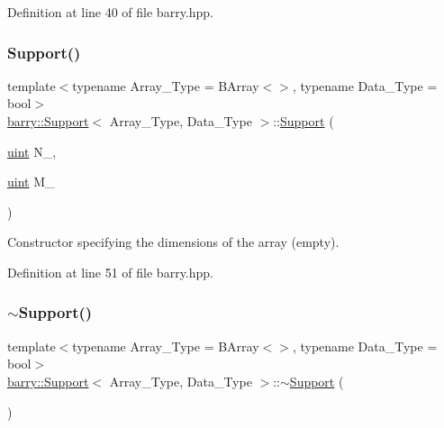 Definition at line 40 of file barry.\+hpp.

\mbox{\label{classbarry_1_1_support_aa451bd21c09935b686869fef96c5b874}} 
\subsubsection{\texorpdfstring{Support()}{Support()}\hspace{0.1cm}{\footnotesize\ttfamily [2/2]}}
{\footnotesize\ttfamily template$<$typename Array\+\_\+\+Type  = B\+Array$<$$>$, typename Data\+\_\+\+Type  = bool$>$ \\
\hyperlink{classbarry_1_1_support}{barry\+::\+Support}$<$ Array\+\_\+\+Type, Data\+\_\+\+Type $>$\+::\hyperlink{classbarry_1_1_support}{Support} (\begin{DoxyParamCaption}\item[{\hyperlink{namespacebarry_a11dfc53ddb4672278319aa04f1e09a6c}{uint}}]{N\+\_\+,  }\item[{\hyperlink{namespacebarry_a11dfc53ddb4672278319aa04f1e09a6c}{uint}}]{M\+\_\+ }\end{DoxyParamCaption})\hspace{0.3cm}{\ttfamily [inline]}}



Constructor specifying the dimensions of the array (empty). 



Definition at line 51 of file barry.\+hpp.

\mbox{\label{classbarry_1_1_support_a1ffd5ee63fa68338cbbf443e1e54e5b4}} 
\subsubsection{\texorpdfstring{$\sim$\+Support()}{~Support()}}
{\footnotesize\ttfamily template$<$typename Array\+\_\+\+Type  = B\+Array$<$$>$, typename Data\+\_\+\+Type  = bool$>$ \\
\hyperlink{classbarry_1_1_support}{barry\+::\+Support}$<$ Array\+\_\+\+Type, Data\+\_\+\+Type $>$\+::$\sim$\hyperlink{classbarry_1_1_support}{Support} (\begin{DoxyParamCaption}{ }\end{DoxyParamCaption})\hspace{0.3cm}{\ttfamily [inline]}}



